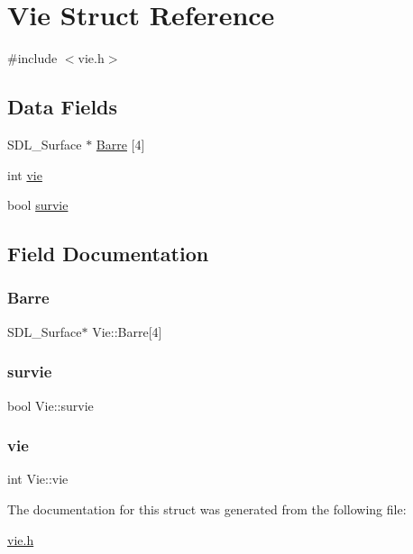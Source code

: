 \hypertarget{structVie}{}\section{Vie Struct Reference}
\label{structVie}


{\ttfamily \#include $<$vie.\+h$>$}

\subsection*{Data Fields}
\begin{DoxyCompactItemize}
\item 
S\+D\+L\+\_\+\+Surface $\ast$ \hyperlink{structVie_a770abc90d338d1ed76963effe535ee8b}{Barre} \mbox{[}4\mbox{]}
\item 
int \hyperlink{structVie_ac4c6d3dc278ec9e765a3be8cf2155280}{vie}
\item 
bool \hyperlink{structVie_a317b753a4d1e84443101b85fd85e4962}{survie}
\end{DoxyCompactItemize}


\subsection{Field Documentation}
\mbox{\label{structVie_a770abc90d338d1ed76963effe535ee8b}} 
\subsubsection{\texorpdfstring{Barre}{Barre}}
{\footnotesize\ttfamily S\+D\+L\+\_\+\+Surface$\ast$ Vie\+::\+Barre\mbox{[}4\mbox{]}}

\mbox{\label{structVie_a317b753a4d1e84443101b85fd85e4962}} 
\subsubsection{\texorpdfstring{survie}{survie}}
{\footnotesize\ttfamily bool Vie\+::survie}

\mbox{\label{structVie_ac4c6d3dc278ec9e765a3be8cf2155280}} 
\subsubsection{\texorpdfstring{vie}{vie}}
{\footnotesize\ttfamily int Vie\+::vie}



The documentation for this struct was generated from the following file\+:\begin{DoxyCompactItemize}
\item 
\hyperlink{vie_8h}{vie.\+h}\end{DoxyCompactItemize}
